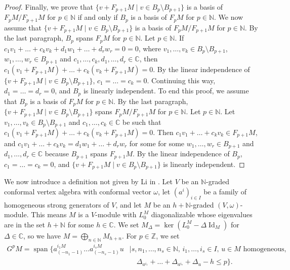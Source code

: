 \documentclass[a4paper, 12pt, reqno]{amsart}
\theoremstyle{remark}
\DeclareMathOperator{\Id}{Id}
\DeclareMathOperator{\vspan}{span}
\begin{document}
\begin{proof}
  Finally, we prove that $\{v + F_{p + 1}M \mid v \in B_p \setminus B_{p + 1}\}$ is a basis of $F_pM/F_{p + 1}M$ for $p \in \mathbb{N}$ if and only if $B_p$ is a basis of $F_pM$ for $p \in \mathbb{N}$.
  We now assume that $\{v + F_{p + 1}M \mid v \in B_p \setminus B_{p + 1}\}$ is a basis of $F_pM/F_{p + 1}M$ for $p \in \mathbb{N}$.
  By the last paragraph, $B_p$ spans $F_pM$ for $p \in \mathbb{N}$.
  Let $p \in \mathbb{N}$.
  If $c_1v_1 + \dots + c_kv_k + d_1w_1 + \dots + d_rw_r = 0 = 0$, where $v_1, \dots, v_k \in B_p \setminus B_{p + 1}$, $w_1, \dots, w_r \in B_{p + 1}$ and $c_1, \dots, c_k, d_1, \dots, d_r \in \mathbb{C}$, then $c_1(v_1 + F_{p + 1}M) + \dots + c_k(v_k + F_{p + 1}M) = 0$.
  By the linear independence of $\{v + F_{p + 1}M \mid v \in B_p \setminus B_{p + 1}\}$, $c_1 = \dots = c_k = 0$.
  Continuing this way, $d_1 = \dots = d_r = 0$, and $B_p$ is linearly independent.
  To end this proof, we assume that $B_p$ is a basis of $F_pM$ for $p \in \mathbb{N}$.
  By the last paragraph, $\{v + F_{p + 1}M \mid v \in B_p \setminus B_{p + 1}\}$ spans $F_pM/F_{p + 1}M$ for $p \in \mathbb{N}$.
  Let $p \in \mathbb{N}$.
  Let $v_1, \dots, v_k \in B_p \setminus B_{p + 1}$ and $c_1, \dots, c_k \in \mathbb{C}$ be such that $c_1(v_1 + F_{p + 1}M) + \dots + c_k(v_k + F_{p + 1}M) = 0$.
  Then $c_1v_1 + \dots + c_kv_k \in F_{p + 1}M$, and $c_1v_1 + \dots + c_kv_k = d_1w_1 + \dots + d_rw_r$ for some for some $w_1, \dots, w_r \in B_{p + 1}$ and $d_1, \dots, d_r \in \mathbb{C}$ because $B_{p + 1}$ spans $F_{p + 1}M$.
  By the linear independence of $B_p$, $c_1 = \dots = c_k = 0$, and $\{v + F_{p + 1}M \mid v \in B_p \setminus B_{p + 1}\}$ is linearly independent.
\end{proof}

We now introduce a definition not given by Li in \cite{li_vertex_2004}.
Let $V$ be an $\mathbb{N}$-graded conformal vertex algebra with conformal vector $\omega$, let $(a^i)_{i \in I}$ be a family of homogeneous strong generators of $V$, and let $M$ be an $h + \mathbb{N}$-graded $(V, \omega)$-module.
This means $M$ is a $V$-module with $L_0^M$ diagonalizable whose eigenvalues are in the set $h + \mathbb{N}$ for some $h \in \mathbb{C}$.
We set $M_{\Delta} = \ker(L^M_0 - \Delta\Id_M)$ for $\Delta \in \mathbb{C}$, so we have $M = \bigoplus_{n \in \mathbb{N}}M_{h + n}$.
For $p \in \mathbb{Z}$, we set
\begin{equation*}
  \begin{split}
    G^pM = \vspan\{a^{i_1M}_{(-n_1 - 1)}\dots a^{i_sM}_{(-n_s - 1)}u &\mid \text{$s, n_1, \dots, n_s \in \mathbb{N}$, $i_1, \dots, i_s \in I$, $u \in M$ homogeneous,} \\
                                                                     &\quad \Delta_{a^{i_1}} + \dots + \Delta_{a^{i_s}} + \Delta_u - h \le p\}.
  \end{split}
\end{equation*}
\end{document}
